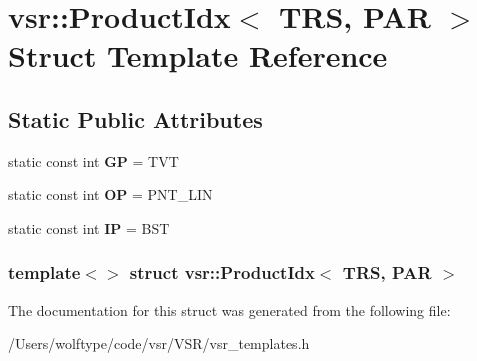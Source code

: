 \hypertarget{structvsr_1_1_product_idx_3_01_t_r_s_00_01_p_a_r_01_4}{\section{vsr\-:\-:Product\-Idx$<$ T\-R\-S, P\-A\-R $>$ Struct Template Reference}
\label{structvsr_1_1_product_idx_3_01_t_r_s_00_01_p_a_r_01_4}
}
\subsection*{Static Public Attributes}
\begin{DoxyCompactItemize}
\item 
\hypertarget{structvsr_1_1_product_idx_3_01_t_r_s_00_01_p_a_r_01_4_adc891a3482db82b4d4aab564452d7fd0}{static const int {\bfseries G\-P} = T\-V\-T}\label{structvsr_1_1_product_idx_3_01_t_r_s_00_01_p_a_r_01_4_adc891a3482db82b4d4aab564452d7fd0}

\item 
\hypertarget{structvsr_1_1_product_idx_3_01_t_r_s_00_01_p_a_r_01_4_a2564e4698dfbf87be8ad36f4e564b2a4}{static const int {\bfseries O\-P} = P\-N\-T\-\_\-\-L\-I\-N}\label{structvsr_1_1_product_idx_3_01_t_r_s_00_01_p_a_r_01_4_a2564e4698dfbf87be8ad36f4e564b2a4}

\item 
\hypertarget{structvsr_1_1_product_idx_3_01_t_r_s_00_01_p_a_r_01_4_a331e38a7b0f464993f77b1afd252438d}{static const int {\bfseries I\-P} = B\-S\-T}\label{structvsr_1_1_product_idx_3_01_t_r_s_00_01_p_a_r_01_4_a331e38a7b0f464993f77b1afd252438d}

\end{DoxyCompactItemize}
\subsubsection*{template$<$$>$ struct vsr\-::\-Product\-Idx$<$ T\-R\-S, P\-A\-R $>$}



The documentation for this struct was generated from the following file\-:\begin{DoxyCompactItemize}
\item 
/\-Users/wolftype/code/vsr/\-V\-S\-R/vsr\-\_\-templates.\-h\end{DoxyCompactItemize}
